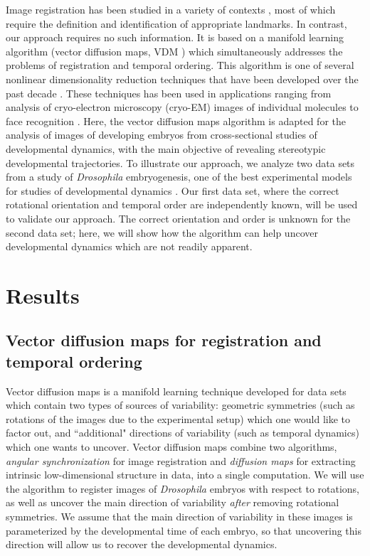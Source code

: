 \documentclass{pnastwo}
\begin{document}
\begin{article}
Image registration has been studied in a variety of contexts \cite{zitova2003image, rowley1998rotation, hajnal2010medical, greenspan1994rotation, zhao2003face}, 
most of which require the definition and identification of appropriate landmarks.
%
In contrast, our approach requires no such information. 
%
It is based on a manifold learning algorithm (vector diffusion maps, VDM \cite{singer2012vector}) which simultaneously addresses the problems of registration and temporal ordering. 
%
This algorithm is one of several nonlinear dimensionality reduction techniques that have been developed over the past decade \cite{Belkin2003, coifman2005geometric, coifman2006geometric, tenenbaum2000global, roweis2000nonlinear}. 
%
These techniques has been used in
applications ranging from analysis of cryo-electron microscopy (cryo-EM) images of individual molecules  \cite{zhao2014rotationally, singer2011viewing} to face recognition \cite{lafon2006data}.
%
Here, the vector diffusion maps algorithm is adapted for the analysis of images of developing embryos from cross-sectional studies of developmental dynamics, with the main objective of revealing stereotypic developmental trajectories.
%
To illustrate our approach, we analyze two data sets from a study of {\it Drosophila} embryogenesis, one of the best experimental models for studies of developmental dynamics \cite{jaeger2012drosophila}.
%
Our first data set, where the correct rotational orientation and temporal order are independently known, will be used to validate our approach.
%
The correct orientation and order is unknown for the second data set; here, we will show how the algorithm can help uncover developmental dynamics which are not readily apparent. 


\section{Results}

\subsection{Vector diffusion maps for registration and temporal ordering}

Vector diffusion maps \cite{singer2012vector} is a manifold learning
technique developed for data sets which contain two types of sources of variability:
geometric symmetries (such as rotations of the images due to the experimental setup) which one would like to factor out,
and ``additional" directions of variability (such as temporal dynamics) which one wants to uncover.
%
Vector diffusion maps combine two algorithms, {\em angular synchronization} \cite{singer2011angular} for image registration and {\em diffusion maps} \cite{coifman2005geometric} for extracting intrinsic low-dimensional structure in data, into a single computation.
%
We will use the algorithm to register images of {\it Drosophila} embryos with respect to rotations, as well as uncover the main direction of variability {\it after} removing rotational symmetries.
%
We assume that the main direction of variability in these images is parameterized by the developmental time of each embryo, so that uncovering this direction will allow us to recover the developmental dynamics.


\end{article}
\end{document}
